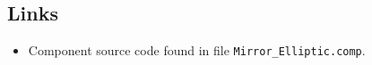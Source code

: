 \subsection*{Links}
\begin{itemize}
  \item Component source code found in file \texttt{Mirror\_Elliptic.comp}.
\end{itemize}
